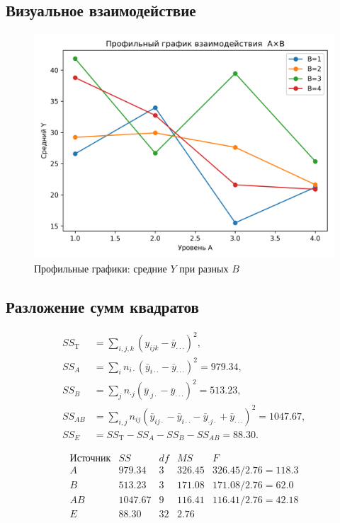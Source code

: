 \documentclass[areasetadvanced]{scrartcl}
\begin{document}

\subsection{Визуальное взаимодействие}
\begin{figure}[H]
  \centering
  \includegraphics[width=.6\textwidth]{figs/task2_interaction.png}
  \caption{Профильные графики: средние $Y$ при разных $B$}
\end{figure}

\subsection{Разложение сумм квадратов}
\[
\begin{aligned}
SS_{\text{T}}&=\sum_{i,j,k}(y_{ijk}-\bar y_{\cdot\cdot\cdot})^2,\\
SS_A&=\sum_i n_{i\cdot}(\bar y_{i\cdot\cdot}-\bar y_{\cdot\cdot\cdot})^2
      =979.34,\\
SS_B&=\sum_j n_{\cdot j}(\bar y_{\cdot j\cdot}-\bar y_{\cdot\cdot\cdot})^2
      =513.23,\\
SS_{AB}&=\sum_{i,j} n_{ij}(\bar y_{ij\cdot}-\bar y_{i\cdot\cdot}
          -\bar y_{\cdot j\cdot}+\bar y_{\cdot\cdot\cdot})^2
        =1047.67,\\
SS_E&=SS_{\text{T}}-SS_A-SS_B-SS_{AB}=88.30.
\end{aligned}
\]

\[
\begin{array}{l|cccc}
\text{Источник} & SS & df & MS & F\\\hline
A & 979.34 & 3 & 326.45 & 326.45/2.76 =118.3\\
B & 513.23 & 3 & 171.08 & 171.08/2.76 = 62.0\\
AB&1047.67 & 9 & 116.41 & 116.41/2.76 = 42.18\\
E &  88.30 &32 & 2.76 & \\
\end{array}
\]
\end{document}
